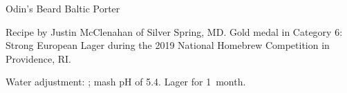 \begin{recipe}{Odin's Beard Baltic Porter}

\begin{aboutblock}
Recipe by Justin McClenahan of Silver Spring, MD. Gold medal in Category 6:
Strong European Lager during the 2019 National Homebrew Competition in
Providence, RI. \sourceaha
\end{aboutblock}


\begin{methodandtiming}
 
\begin{mashsteps}
\end{mashsteps}

\begin{fermentationsteps}
\end{fermentationsteps}

\begin{directions}
Water adjustment: ; mash pH of 5.4.
Lager for 1~month.
\end{directions}

\end{methodandtiming}

\recipebreak

\begin{ingredientsblock}

\begin{malts}
\end{malts}

\begin{hops}
\end{hops}

\begin{yeastsx}
\end{yeastsx}

\end{ingredientsblock}

\end{recipe}
